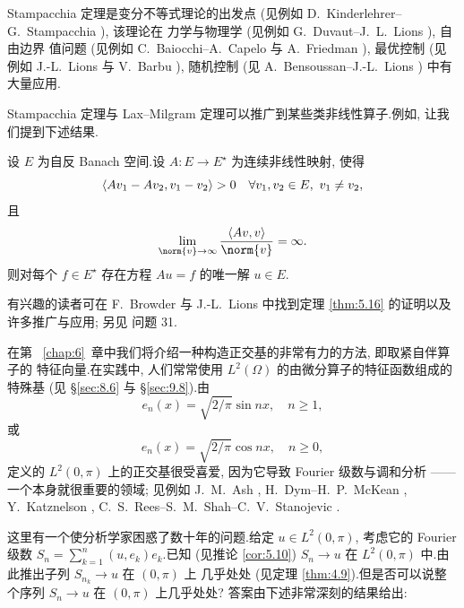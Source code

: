 Stampacchia 定理是变分不等式理论的出发点 (见例如
D.~Kinderlehrer--G.~Stampacchia ), 该理论在
力学与物理学 (见例如 G.~Duvaut--J.~L.~Lions ), 自由边界
值问题 (见例如 C.~Baiocchi--A.~Capelo  与
A.~Friedman ), 最优控制 (见例如 J.-L.~Lions
 与 V.~Barbu ), 随机控制 (见
A.~Bensoussan--J.-L.~Lions ) 中有大量应用.

Stampacchia 定理与 Lax--Milgram 定理可以推广到某些类非线性算子.例如,
让我们提到下述结果.

\begin{theorem}
\label{thm:5.16}
设 $E$ 为自反 Banach 空间.设 $A:E\to E^\star$ 为连续非线性映射, 使得
\begin{equation*}
\left\langle Av_1-Av_2,v_1-v_2\right\rangle>0\quad\forall v_1,v_2\in E,\ v_1\ne v_2,
\end{equation*}
且
\begin{equation*}
\lim_{\norm{v}\to\infty}\frac{\dual{Av}{v}}{\norm{v}}=\infty.
\end{equation*}
则对每个 $f\in E^\star$ 存在方程 $Au=f$ 的唯一解 $u\in E$.
\end{theorem}

有兴趣的读者可在 F.~Browder  与 J.-L.~Lions
 中找到定理  \ref{thm:5.16} 的证明以及许多推广与应用; 另见
问题 31.

在第~
\ref{chap:6}~章中我们将介绍一种构造正交基的非常有力的方法, 即取紧自伴算子的
特征向量.在实践中, 人们常常使用 $L^2(\Omega)$ 的由微分算子的特征函数组成的
特殊基 (见 \S\ref{sec:8.6} 与 \S\ref{sec:9.8}).由
\begin{equation*}
e_n(x)=\sqrt{2/\pi}\sin nx,\quad n\ge1,
\end{equation*}
或
\begin{equation*}
e_n(x)=\sqrt{2/\pi}\cos nx,\quad n\ge0,
\end{equation*}
定义的 $L^2(0,\pi)$ 上的正交基很受喜爱, 因为它导致 Fourier 级数与调和分析
——一个本身就很重要的领域; 见例如 J.~M.~Ash , H.~Dym--H.~P.~McKean , Y.~Katznelson
, C.~S.~Rees--S.~M.~Shah--C.~V.~Stanojevic
.

这里有一个使分析学家困惑了数十年的问题.给定 $u\in L^2(0,\pi)$, 考虑它的
Fourier 级数 $S_n=\sum_{k=1}^n(u,e_k)e_k$.已知 (见推论  \ref{cor:5.10})
$S_n\to u$ 在 $L^2(0,\pi)$ 中.由此推出子列 $S_{n_k}\to u$ 在 $(0,\pi)$ 上
几乎处处 (见定理  \ref{thm:4.9}).但是否可以说整个序列 $S_n\to u$ 在
$(0,\pi)$ 上几乎处处? 答案由下述非常深刻的结果给出:

